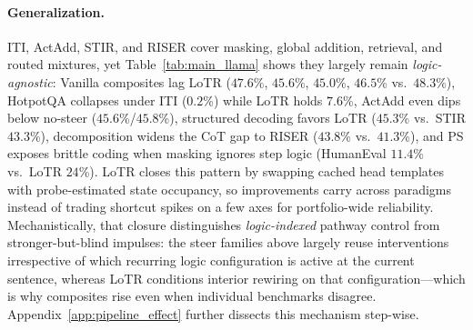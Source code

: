 \vspace{-1mm}
\paragraph{Generalization.}
ITI, ActAdd, STIR, and RISER cover masking, global addition, retrieval, and routed mixtures, yet Table~\ref{tab:main_llama} shows they largely remain \emph{logic-agnostic}: Vanilla composites lag LoTR ($47.6$\%, $45.6$\%, $45.0$\%, $46.5$\% vs.\ $48.3$\%), HotpotQA collapses under ITI ($0.2$\%) while LoTR holds $7.6$\%, ActAdd even dips below no-steer ($45.6$\%/$45.8$\%), structured decoding favors LoTR ($45.3$\% vs.\ STIR $43.3$\%), decomposition widens the CoT gap to RISER ($43.8$\% vs.\ $41.3$\%), and PS exposes brittle coding when masking ignores step logic (HumanEval $11.4$\% vs.\ LoTR $24$\%).
LoTR closes this pattern by swapping cached head templates with probe-estimated state occupancy, so improvements carry across paradigms instead of trading shortcut spikes on a few axes for portfolio-wide reliability.
Mechanistically, that closure distinguishes \emph{logic-indexed} pathway control from stronger-but-blind impulses: the steer families above largely reuse interventions irrespective of which recurring logic configuration is active at the current sentence, whereas LoTR conditions interior rewiring on that configuration---which is why composites rise even when individual benchmarks disagree.
Appendix~\ref{app:pipeline_effect} further dissects this mechanism step-wise.

